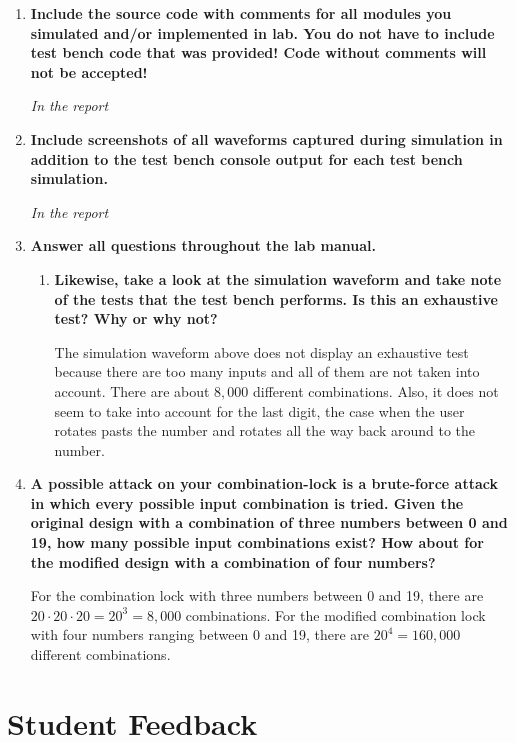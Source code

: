 \documentclass[a4paper,12pt]{article}
\begin{document}
\begin{enumerate}
  \item \textbf{Include the source code with comments for all modules you simulated and/or implemented in lab. You do not have to include test bench code that was provided! Code without comments will not be
accepted!}

  \textit{In the report}

  \item \textbf{Include screenshots of all waveforms captured during simulation in addition to the test bench console output for each test bench simulation.}
  
  \textit{In the report}

  \item \textbf{Answer all questions throughout the lab manual.}
  
  \begin{enumerate}
    \item \textbf{Likewise, take a look at the simulation waveform and take note of the tests that the test bench performs. Is this an exhaustive test? Why or why not?}
    
  The simulation waveform above does not display an exhaustive test because there are too many inputs and all of them are not taken into account. There are about $8,000$ different combinations. Also, it does not seem to take into account for the last digit, the case when the user rotates pasts the number and rotates all the way back around to the number.
  \end{enumerate}
  
  \item \textbf{A possible attack on your combination-lock is a brute-force attack in which every possible input combination is tried. Given the original design with a combination of three numbers between 0 and 19, how many possible input combinations exist? How about for the modified design with a combination of four numbers?}
  
  For the combination lock with three numbers between 0 and 19, there are $20 \cdot 20 \cdot 20 = 20^{3} = 8,000$ combinations. For the modified combination lock with four numbers ranging between 0 and 19, there are $20^4 = 160,000$ different combinations. 
\end{enumerate}

\section*{Student Feedback}
\end{document}
